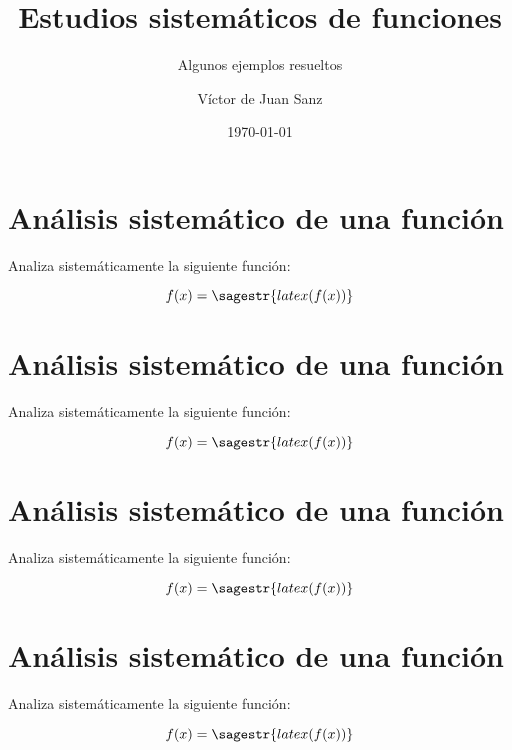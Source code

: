 \documentclass[nochap,palatino,nobuilddate]{estudioFuncion}
\title{Estudios sistemáticos de funciones}
\author{Víctor de Juan Sanz}
\date{\today}
\subtitle{Algunos ejemplos resueltos}
\newif\ifbreve
\newcommand{\newexample}[1]{
	\section{Análisis sistemático de una función}
	Analiza sistemáticamente la siguiente función:
	
	\begin{mdframed}
	\[f(x) = \sagestr{latex(f(x))}\]
	\end{mdframed}
	\ifbreve
		
	\else
		
	\fi
	\newpage
}
\begin{document}
\maketitle


\newexample{tex/fun1}
\newexample{tex/fun2}
\newexample{tex/fun3}
\newexample{tex/fun4}
\end{document}
